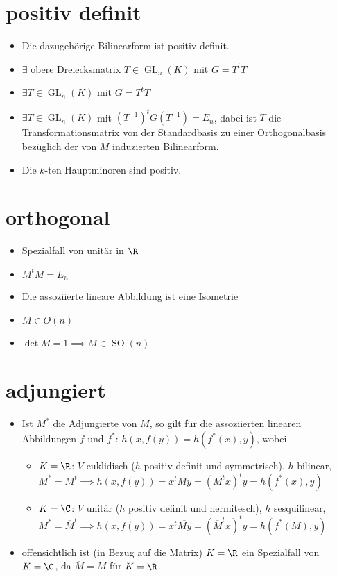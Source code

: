 \documentclass{article}
\begin{document}
\section{positiv definit}
    \begin{itemize}
        \item Die dazugehörige Bilinearform ist positiv definit.
        \item $\exists$ obere Dreiecksmatrix  $T \in \operatorname{GL}_n(K)$ mit $G = T^tT$
        \item $\exists T \in \operatorname{GL}_n(K)$ mit $G = T^tT$
        \item $\exists T \in \operatorname{GL}_n(K)$ mit $(T^{-1})^tG(T^{-1}) = E_n$, dabei ist $T$ die Transformationsmatrix von der Standardbasis zu einer Orthogonalbasis bezüglich der von $M$ induzierten Bilinearform.
        \item Die $k$-ten Hauptminoren sind positiv.
    \end{itemize}
\section{orthogonal}
\begin{itemize}
    \item Spezialfall von unitär in $\R$
    \item $M^tM = E_n$
    \item Die assoziierte lineare Abbildung ist eine Isometrie
    \item $M \in O(n)$
    \item $\det M = 1\implies M \in \operatorname{SO}(n)$
\end{itemize}
\section{adjungiert}
\begin{itemize}
    \item Ist $M^*$ die Adjungierte von $M$, so gilt für die assoziierten linearen Abbildungen $f$ und $f^*$: $h(x, f(y)) = h(f^*(x), y)$, wobei
    \begin{itemize}
        \item $K = \R$: $V$ euklidisch ($h$ positiv definit und symmetrisch), $h$ bilinear, $M^* = M^t \implies h(x, f(y)) = x^t M y = (M ^t x)^t y = h(f^*(x), y)$
        \item $K = \C$: $V$ unitär ($h$ positiv definit und hermitesch), $h$ sesquilinear, $M^* = \overline{M}^t \implies h(x, f(y)) = x^t \overline{My} = (\overline{M}^tx)^ty = h(f^*(M), y)$
    \end{itemize}
    \item offensichtlich ist (in Bezug auf die Matrix) $K = \R$ ein Spezialfall von $K = \C$, da $\overline{M} = M$ für $K = \R$.
\end{itemize}
\end{document}

